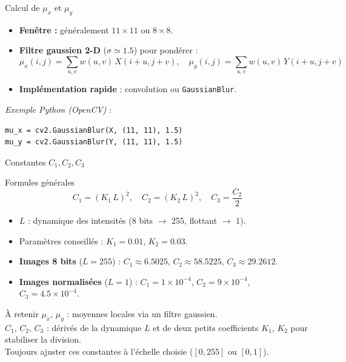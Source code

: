\documentclass{beamer}
\begin{document}
\begin{frame}[t,fragile]{Calcul de $\mu_x$ et $\mu_y$}
\small
\setlength{\itemsep}{0.35em}
\begin{itemize}
  \item \textbf{Fenêtre :} généralement $11\times11$ ou $8\times8$.
  \item \textbf{Filtre gaussien 2-D} ($\sigma\simeq1.5$) pour pondérer :
    \[
      \mu_x(i,j)=\sum_{u,v} w(u,v)\,X(i+u,j+v),\quad
      \mu_y(i,j)=\sum_{u,v} w(u,v)\,Y(i+u,j+v)
    \]
  \item \textbf{Implémentation rapide} : convolution ou \texttt{GaussianBlur}.
\end{itemize}

\vspace{0.2em}
\textit{Exemple Python (OpenCV)} :
\begin{verbatim}
mu_x = cv2.GaussianBlur(X, (11, 11), 1.5)
mu_y = cv2.GaussianBlur(Y, (11, 11), 1.5)
\end{verbatim}
\end{frame}


\begin{frame}[t]{Constantes $C_1, C_2, C_3$}
\small
\begin{block}{Formules générales}
\[
  C_1 = (K_1\,L)^2,\quad
  C_2 = (K_2\,L)^2,\quad
  C_3 = \frac{C_2}{2}
\]
\end{block}

\setlength{\itemsep}{0.4em}
\begin{itemize}
  \item $L$ : dynamique des intensités (8 bits $\to$ 255, flottant $\to$ 1).
  \item Paramètres conseillés : $K_1 = 0.01$, $K_2 = 0.03$.
  \item \textbf{Images 8 bits} ($L = 255$) :  
        $C_1 \approx 6.5025$, $C_2 \approx 58.5225$, $C_3 \approx 29.2612$.
  \item \textbf{Images normalisées} ($L = 1$) :  
        $C_1 = 1\times10^{-4}$, $C_2 = 9\times10^{-4}$, $C_3 = 4.5\times10^{-4}$.
\end{itemize}

\begin{alertblock}{À retenir}
$\mu_x,\,\mu_y$ : moyennes locales via un filtre gaussien.\\
$C_1,\,C_2,\,C_3$ : dérivés de la dynamique $L$ et de deux petits coefficients
$K_1$, $K_2$ pour stabiliser la division.\\
Toujours ajuster ces constantes à l’échelle choisie ($[0,255]$ ou $[0,1]$).
\end{alertblock}
\end{frame}
\end{document}
